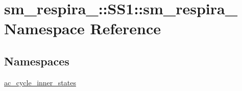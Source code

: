 \hypertarget{namespacesm__respira__1_1_1SS1_1_1sm__respira__1}{}\section{sm\+\_\+respira\+\_\+:\+:S\+S1\+:\+:sm\+\_\+respira\+\_ Namespace Reference}
\label{namespacesm__respira__1_1_1SS1_1_1sm__respira__1}
\subsection*{Namespaces}
\begin{DoxyCompactItemize}
\item 
 \hyperlink{namespacesm__respira__1_1_1SS1_1_1sm__respira__1_1_1ac__cycle__inner__states}{ac\+\_\+cycle\+\_\+inner\+\_\+states}
\end{DoxyCompactItemize}
